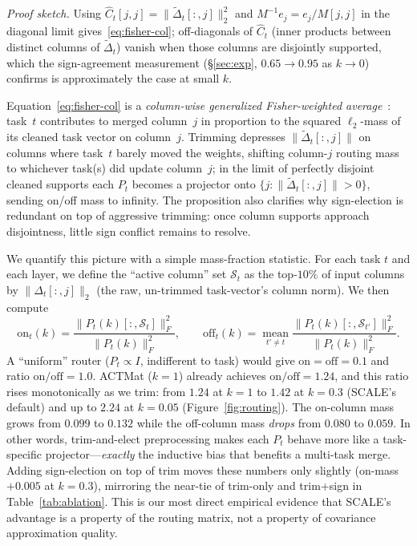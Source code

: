 \documentclass{article} %
\begin{document}
\noindent\emph{Proof sketch.} Using $\hat C_t[j,j]=\|\tilde\Delta_t[:,j]\|_2^2$ and $M^{-1}e_j = e_j / M[j,j]$ in the diagonal limit gives~\eqref{eq:fisher-col}; off-diagonals of $\hat C_t$ (inner products between distinct columns of $\tilde\Delta_t$) vanish when those columns are disjointly supported, which the sign-agreement measurement (\S\ref{sec:exp}, $0.65 \to 0.95$ as $k\to 0$) confirms is approximately the case at small $k$.

Equation~\eqref{eq:fisher-col} is a \emph{column-wise generalized Fisher-weighted average}~\citep{matena2022merging}: task~$t$ contributes to merged column~$j$ in proportion to the squared $\ell_2$-mass of its cleaned task vector on column~$j$. Trimming depresses $\|\tilde\Delta_t[:,j]\|$ on columns where task~$t$ barely moved the weights, shifting column-$j$ routing mass to whichever task(s) did update column~$j$; in the limit of perfectly disjoint cleaned supports each $P_t$ becomes a projector onto $\{j:\|\tilde\Delta_t[:,j]\|>0\}$, sending on/off mass to infinity. The proposition also clarifies why sign-election is redundant on top of aggressive trimming: once column supports approach disjointness, little sign conflict remains to resolve.

We quantify this picture with a simple mass-fraction statistic. For each task $t$ and each layer, we define the ``active column'' set $\mathcal{S}_t$ as the top-$10\%$ of input columns by $\|\Delta_t[:,j]\|_2$ (the raw, un-trimmed task-vector's column norm). We then compute
\[
  \mathrm{on}_t(k) = \frac{\|P_t(k)[:,\mathcal{S}_t]\|_F^2}{\|P_t(k)\|_F^2},
  \qquad
  \mathrm{off}_t(k) = \operatorname*{mean}_{t'\neq t}\frac{\|P_t(k)[:,\mathcal{S}_{t'}]\|_F^2}{\|P_t(k)\|_F^2}.
\]
A ``uniform'' router ($P_t \propto I$, indifferent to task) would give $\mathrm{on}=\mathrm{off}=0.1$ and ratio $\mathrm{on}/\mathrm{off}=1.0$. ACTMat ($k{=}1$) already achieves $\mathrm{on}/\mathrm{off}=1.24$, and this ratio rises monotonically as we trim: from $1.24$ at $k{=}1$ to $1.42$ at $k{=}0.3$ (SCALE's default) and up to $2.24$ at $k{=}0.05$ (Figure~\ref{fig:routing}). The on-column mass grows from $0.099$ to $0.132$ while the off-column mass \emph{drops} from $0.080$ to $0.059$. In other words, trim-and-elect preprocessing makes each $P_t$ behave more like a task-specific projector---\emph{exactly} the inductive bias that benefits a multi-task merge. Adding sign-election on top of trim moves these numbers only slightly (on-mass $+0.005$ at $k{=}0.3$), mirroring the near-tie of trim-only and trim+sign in Table~\ref{tab:ablation}. This is our most direct empirical evidence that SCALE's advantage is a property of the routing matrix, not a property of covariance approximation quality.
\end{document}
